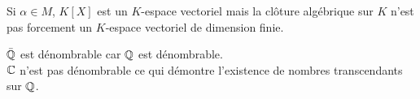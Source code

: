 \begin{remarque}
	Si $\alpha \in M$, $K[X]$ est un $K$-espace vectoriel mais la clôture algébrique sur
	$K$ n'est pas forcement un $K$-espace vectoriel de dimension finie.
\end{remarque}

\begin{remarque}
	$\bar{\mathbb{Q}}$ est dénombrable car $\mathbb{Q}$ est dénombrable.\\
	$\mathbb{C}$ n'est pas dénombrable ce qui démontre l'existence de nombres transcendants sur $\mathbb{Q}$.
\end{remarque}




